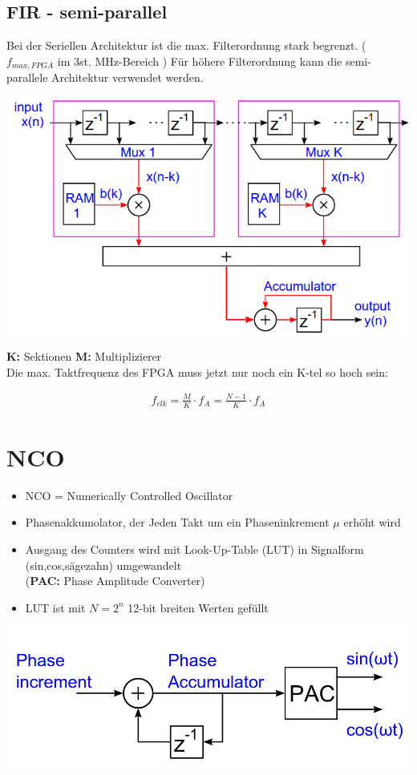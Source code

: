 \documentclass[10pt,a4paper]{article}
\begin{document}
\subsection{FIR - semi-parallel}
Bei der Seriellen Architektur ist die max. Filterordnung stark begrenzt. ($f_{max,FPGA}$ im 3st. MHz-Bereich )
Für höhere Filterordnung kann die semi-parallele Architektur verwendet werden.
  \begin{center}
      \includegraphics[width=.35\textwidth]{./img/firsemi.png}
  \end{center}
 \textbf{K:} Sektionen \textbf{M:} Multiplizierer \\
Die max. Taktfrequenz des FPGA muss jetzt nur noch ein K-tel so hoch sein:
  \begin{mdframed}[style=exercise]
    \begin{align}
        f_{clk}= \frac{M}{K}\cdot f_A = \frac{N-1}{K} \cdot f_A
    \end{align}
  \end{mdframed}

\section{NCO}
\begin{itemize}
  \item NCO = \grqq{}Numerically Controlled Oscillator\grqq{}
  \item Phasenakkumolator, der Jeden Takt um ein Phaseninkrement $\mu$ erhöht wird
  \item Ausgang des Counters wird mit Look-Up-Table (LUT) in Signalform (sin,cos,sägezahn) umgewandelt \\(\textbf{PAC:} Phase Amplitude Converter)
  \item LUT ist mit $N = 2^n$ 12-bit breiten Werten gefüllt 
\end{itemize}

\begin{center}
  \includegraphics[width=.5\textwidth]{./img/NCO_schema.png}
\end{center}
\end{document}
